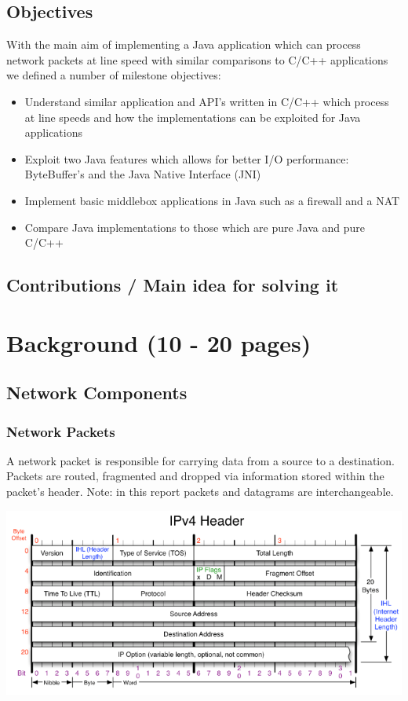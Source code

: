 \documentclass[a4paper, titlepage]{article}
\begin{document}
\subsection{Objectives}
With the main aim of implementing a Java application which can process network packets at line speed with similar comparisons to C/C++ applications we defined a number of milestone objectives:
\begin{itemize}
	\item Understand similar application and API's written in C/C++ which process at line speeds and how the implementations can be exploited for Java applications
	\item Exploit two Java features which allows for better I/O performance: ByteBuffer's and the Java Native Interface (JNI)
	\item Implement basic middlebox applications in Java such as a firewall and a NAT
	\item Compare Java implementations to those which are pure Java and pure C/C++
\end{itemize}

\subsection{Contributions / Main idea for solving it}

\newpage

\section{Background (10 - 20 pages)}
\subsection{Network Components}
\subsubsection{Network Packets}
A network packet is responsible for carrying data from a source to a destination. Packets are routed, fragmented and dropped via information stored within the packet's header. Note: in this report packets and datagrams are interchangeable.

\includegraphics[width=\textwidth]{images/ipv4header.png}
\end{document}
